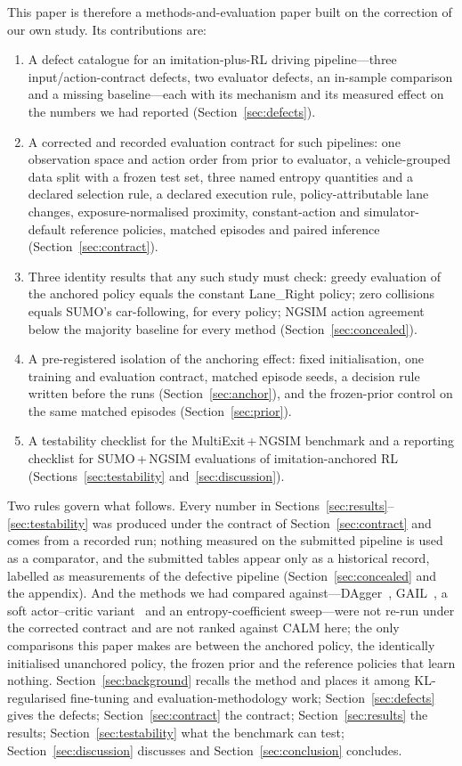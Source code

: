 This paper is therefore a methods-and-evaluation paper built on the correction of our own study. Its contributions are:
\begin{enumerate}
  \item A defect catalogue for an imitation-plus-RL driving pipeline---three input/action-contract defects, two evaluator defects, an in-sample comparison and a missing baseline---each with its mechanism and its measured effect on the numbers we had reported (Section~\ref{sec:defects}).
  \item A corrected and recorded evaluation contract for such pipelines: one observation space and action order from prior to evaluator, a vehicle-grouped data split with a frozen test set, three named entropy quantities and a declared selection rule, a declared execution rule, policy-attributable lane changes, exposure-normalised proximity, constant-action and simulator-default reference policies, matched episodes and paired inference (Section~\ref{sec:contract}).
  \item Three identity results that any such study must check: greedy evaluation of the anchored policy equals the constant Lane\_Right policy; zero collisions equals SUMO's car-following, for every policy; NGSIM action agreement below the majority baseline for every method (Section~\ref{sec:concealed}).
  \item A pre-registered isolation of the anchoring effect: fixed initialisation, one training and evaluation contract, matched episode seeds, a decision rule written before the runs (Section~\ref{sec:anchor}), and the frozen-prior control on the same matched episodes (Section~\ref{sec:prior}).
  \item A testability checklist for the MultiExit\,+\,NGSIM benchmark and a reporting checklist for SUMO\,+\,NGSIM evaluations of imitation-anchored RL (Sections~\ref{sec:testability} and~\ref{sec:discussion}).
\end{enumerate}

Two rules govern what follows. Every number in Sections~\ref{sec:results}--\ref{sec:testability} was produced under the contract of Section~\ref{sec:contract} and comes from a recorded run; nothing measured on the submitted pipeline is used as a comparator, and the submitted tables appear only as a historical record, labelled as measurements of the defective pipeline (Section~\ref{sec:concealed} and the appendix). And the methods we had compared against---DAgger~\cite{ross2011reduction}, GAIL~\cite{ho2016generative}, a soft actor--critic variant~\cite{haarnoja2018soft} and an entropy-coefficient sweep---were not re-run under the corrected contract and are not ranked against CALM here; the only comparisons this paper makes are between the anchored policy, the identically initialised unanchored policy, the frozen prior and the reference policies that learn nothing. Section~\ref{sec:background} recalls the method and places it among KL-regularised fine-tuning and evaluation-methodology work; Section~\ref{sec:defects} gives the defects; Section~\ref{sec:contract} the contract; Section~\ref{sec:results} the results; Section~\ref{sec:testability} what the benchmark can test; Section~\ref{sec:discussion} discusses and Section~\ref{sec:conclusion} concludes.
